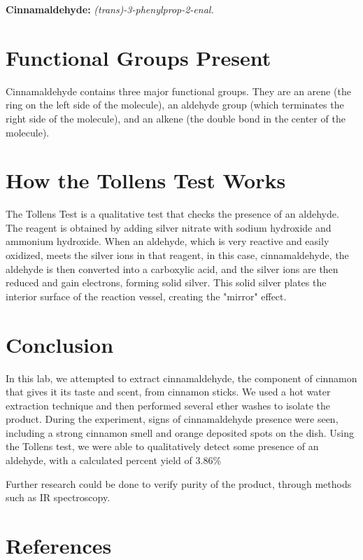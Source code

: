 \documentclass[
  10pt,
  twocolumn,
  letterpaper,
]{article}
\begin{document}
\textbf{Cinnamaldehyde:} \textit{(trans)-3-phenylprop-2-enal.}

\section{Functional Groups Present}

Cinnamaldehyde contains three major functional groups. They are an arene (the ring on the left side of the molecule), an aldehyde group (which terminates the right side of the molecule), and an alkene (the double bond in the center of the molecule).

\section{How the Tollens Test Works}

The Tollens Test is a qualitative test that checks the presence of an aldehyde. The reagent is obtained by adding silver nitrate with sodium hydroxide and ammonium hydroxide. When an aldehyde, which is very reactive and easily oxidized, meets the silver ions in that reagent, in this case, cinnamaldehyde, the aldehyde is then converted into a carboxylic acid, and the silver ions are then reduced and gain electrons, forming solid silver. This solid silver plates the interior surface of the reaction vessel, creating the "mirror" effect.

\section{Conclusion}

In this lab, we attempted to extract cinnamaldehyde, the component of cinnamon that gives it its taste and scent, from cinnamon sticks. We used a hot water extraction technique and then performed several ether washes to isolate the product. During the experiment, signs of cinnamaldehyde presence were seen, including a strong cinnamon smell and orange deposited spots on the dish. Using the Tollens test, we were able to qualitatively detect some presence of an aldehyde, with a calculated percent yield of 3.86\%

Further research could be done to verify purity of the product, through methods such as IR spectroscopy. 
\balance

\section*{References}
\printbibliography[heading=none]
\end{document}
